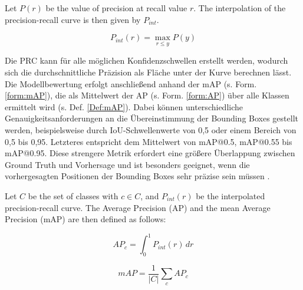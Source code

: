 \begin{definition}
\label{Def:IPRC}
Let $P(r)$ be the value of precision at recall value $r$. 
The interpolation of the precision-recall curve is then given by $P_{int}$.

\begin{equation}
P_{int}(r) = \max_{r \leq y} P(y)
\end{equation}
\end{definition}


Die \acrshort{PRC} kann für alle möglichen Konfidenzschwellen erstellt werden, wodurch sich die durchschnittliche Präzision als Fläche unter der Kurve berechnen lässt. Die Modellbewertung erfolgt anschließend anhand der \acrfull{mAP} (s. Form. \ref{form:mAP}), die als Mittelwert der \acrfull{AP} (s. Form. \ref{form:AP}) über alle Klassen ermittelt wird (s. Def. \ref{Def:mAP})\cite{Rainio2024}. Dabei können unterschiedliche Genauigkeitsanforderungen an die Übereinstimmung der Bounding Boxes gestellt werden, beispielsweise durch IoU-Schwellenwerte von 0,5 oder einem Bereich von 0,5 bis 0,95. Letzteres entspricht dem Mittelwert von \acrshort{mAP}@0.5, \acrshort{mAP}@0.55 bis \acrshort{mAP}@0.95. Diese strengere Metrik erfordert eine größere Überlappung zwischen Ground Truth und Vorhersage und ist besonders geeignet, wenn die vorhergesagten Positionen der Bounding Boxes sehr präzise sein müssen \cite{Rainio2024}.


\begin{definition}
\label{Def:mAP}
Let $C$ be the set of classes with $c \in C$, and $P_{int}(r)$ be the interpolated precision-recall curve. 
The Average Precision (AP) and the mean Average Precision (mAP) are then defined as follows:

\begin{equation}
\label{form:AP}
AP_c = \int_0^1 P_{int}(r)\,dr
\end{equation}

\begin{equation}
\label{form:mAP}
mAP = \frac{1}{|C|} \sum_c AP_c
\end{equation}
\end{definition}

